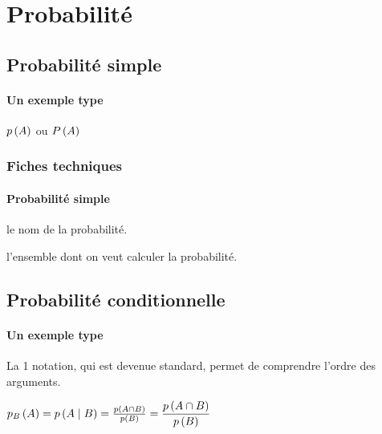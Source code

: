 \documentclass[12pt,a4paper]{article}
\begin{document}
\section{Probabilité}

\subsection{Probabilité \og simple \fg}

\paragraph{Un exemple type}

\begin{latexex}
$\proba{A}$ ou
$\proba[P]{A}$
\end{latexex}




\subsubsection{Fiches techniques}

\paragraph{Probabilité \og simple \fg}


\IDoption{} le nom de la probabilité.

\IDarg{} l'ensemble dont on veut calculer la probabilité.




\subsection{Probabilité conditionnelle}

\paragraph{Un exemple type}

La 1\iere{} notation, qui est devenue standard, permet de comprendre l'ordre des arguments.
\begin{latexex}
$\probacond{B}{A}
 =
 \probacond*{B}{A}
 =
 \probacond**{B}{A}
 =
 \dprobacond**{B}{A}$
\end{latexex}


\end{document}
